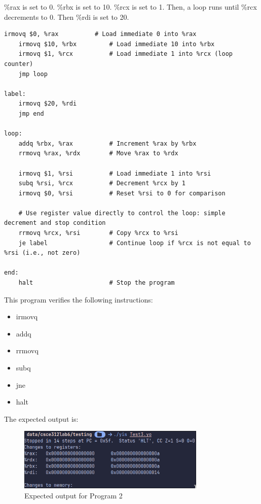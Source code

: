 \documentclass{article}
\begin{document}
\%rax is set to 0. \%rbx is set to 10. 
\%rcx is set to 1. 
Then, a loop runs until \%rcx decrements to 0. 
Then \%rdi is set to 20. 

\begin{lstlisting}[language=myassembly]
    irmovq $0, %rax          # Load immediate 0 into %rax
    irmovq $10, %rbx         # Load immediate 10 into %rbx
    irmovq $1, %rcx          # Load immediate 1 into %rcx (loop counter)
    jmp loop

label:
    irmovq $20, %rdi
    jmp end

loop:
    addq %rbx, %rax          # Increment %rax by %rbx
    rrmovq %rax, %rdx        # Move %rax to %rdx

    irmovq $1, %rsi          # Load immediate 1 into %rsi
    subq %rsi, %rcx          # Decrement %rcx by 1
    irmovq $0, %rsi          # Reset %rsi to 0 for comparison

    # Use register value directly to control the loop: simple decrement and stop condition
    rrmovq %rcx, %rsi        # Copy %rcx to %rsi
    je label                 # Continue loop if %rcx is not equal to %rsi (i.e., not zero)

end:
    halt                     # Stop the program

\end{lstlisting}

This program verifies the following instructions:
\begin{itemize}
    \item irmovq
    \item addq
    \item rrmovq
    \item subq
    \item jne
    \item halt
\end{itemize}

The expected output is:

\begin{figure}[H]
    \centering
    \includegraphics[width=0.8\textwidth]{./images/test3_out.png}
    \caption{Expected output for Program 2}
\end{figure}
\end{document}

